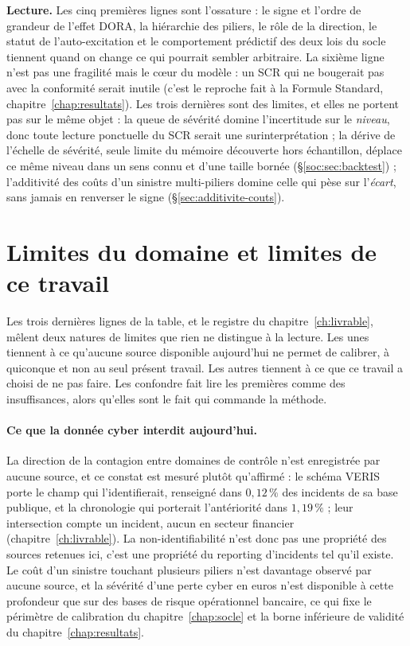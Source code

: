 \vspace{4pt}
\textbf{Lecture.} Les cinq premières lignes sont l'ossature : le signe et l'ordre
de grandeur de l'effet DORA, la hiérarchie des piliers, le rôle de la direction, le statut de
l'auto-excitation et le comportement prédictif des deux lois du socle tiennent quand on change ce
qui pourrait sembler arbitraire. La sixième ligne
n'est pas une fragilité mais le c\oe ur du modèle : un SCR qui ne bougerait pas avec la
conformité serait inutile (c'est le reproche fait à la Formule Standard,
chapitre~\ref{chap:resultats}). Les trois dernières sont des limites, et elles ne portent
pas sur le même objet : la queue de sévérité domine l'incertitude sur le \emph{niveau}, donc toute
lecture ponctuelle du SCR serait une surinterprétation ; la dérive de l'échelle de sévérité, seule
limite du mémoire découverte hors échantillon, déplace ce même niveau dans un sens connu et d'une
taille bornée (\S\ref{soc:sec:backtest}) ; l'additivité des coûts d'un sinistre
multi-piliers domine celle qui pèse sur l'\emph{écart}, sans jamais en renverser le signe
(\S\ref{sec:additivite-couts}).


\section{Limites du domaine et limites de ce travail}
\label{sec:deux-natures-limites}


Les trois dernières lignes de la table, et le registre du chapitre~\ref{ch:livrable}, mêlent
deux natures de limites que rien ne distingue à la lecture. Les unes tiennent à ce qu'aucune
source disponible aujourd'hui ne permet de calibrer, à quiconque et non au seul présent travail.
Les autres tiennent à ce que ce travail a choisi de ne pas faire. Les confondre fait lire les
premières comme des insuffisances, alors qu'elles sont le fait qui commande la méthode.

\paragraph{Ce que la donnée cyber interdit aujourd'hui.} La direction de la contagion entre
domaines de contrôle n'est enregistrée par aucune source, et ce constat est mesuré plutôt
qu'affirmé : le schéma VERIS porte le champ qui l'identifierait, renseigné dans $0{,}12\,\%$ des
incidents de sa base publique, et la chronologie qui porterait l'antériorité dans $1{,}19\,\%$ ;
leur intersection compte un incident, aucun en secteur financier
(chapitre~\ref{ch:livrable}). La non-identifiabilité n'est donc pas une propriété des sources
retenues ici, c'est une propriété du reporting d'incidents tel qu'il existe. Le coût d'un
sinistre touchant plusieurs piliers n'est davantage observé par aucune source, et la sévérité
d'une perte cyber en euros n'est disponible à cette profondeur que sur des bases de risque
opérationnel bancaire, ce qui fixe le périmètre de calibration du chapitre~\ref{chap:socle} et
la borne inférieure de validité du chapitre~\ref{chap:resultats}.

